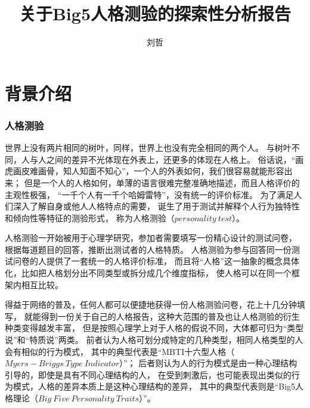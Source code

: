 \documentclass[UTF8]{ctexart}
\begin{document}
\title{关于Big5人格测验的探索性分析报告}
\author{刘哲}
\maketitle
\part{背景介绍}
\section{人格测验}
世界上没有两片相同的树叶，同样，世界上也没有完全相同的两个人。
与树叶不同，人与人之间的差异不光体现在外表上，还更多的体现在人格上。
俗话说，“画虎画皮难画骨，知人知面不知心”，一个人的外表如何，我们很容易就能形容出来；
但是一个人的人格如何，单薄的语言很难完整准确地描述，而且人格评价的主观性极强，
“一千个人有一千个哈姆雷特”，没有统一的评价标准。
为了满足人们深入了解自身或他人人格特点的需要，
诞生了用于测试并解释个人行为独特性和倾向性等特征的测验形式，
称为人格测验（$personality\ test$）。\par
人格测验一开始被用于心理学研究，参加者需要填写一份精心设计的测试问卷，
根据每道题目的回答，推断出测试者的人格特质。
人格测验为参与回答同一份测试问卷的人提供了一套统一的人格评价标准，
而且将“人格”这一抽象的概念具体化，比如把人格划分出不同类型或拆分成几个维度指标，
使人格可以在同一个框架内相互比较。\par
得益于网络的普及，任何人都可以便捷地获得一份人格测验问卷，花上十几分钟填写，
就能得到一份关于自己的人格报告，这种大范围的普及也让人格测验的衍生种类变得越发丰富，
但是按照心理学上对于人格的假说不同，大体都可归为“类型说”和“特质说”两类。
前者认为人格可划分成特定的几种类型，相同人格类型的人会有相似的行为模式，
其中的典型代表是“MBTI十六型人格（$Myers-Briggs\ Type\ Indicator$）”；
后者则认为人的行为模式是由一种心理结构引导的，即使是具有不同心理结构的人，
在受到刺激后，也可能表现出类似的行为模式，人格的差异本质上是这种心理结构的差异，
其中的典型代表则是“Big5人格理论（$Big\ Five\ Personality\ Traits$）”。
\end{document}
